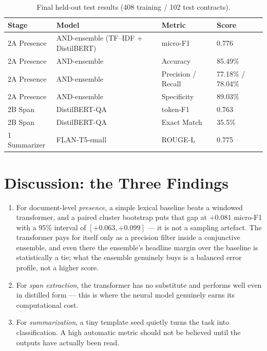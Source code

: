 \begin{table}[ht]
\centering
\caption{Final held-out test results (408 training / 102 test contracts).}
\label{tab:scorecard}
\small
\begin{tabular}{llll}
\toprule
\textbf{Stage} & \textbf{Model} & \textbf{Metric} & \textbf{Score}\\
\midrule
2A Presence & AND-ensemble (TF--IDF + DistilBERT) & micro-F1  & 0.776\\
2A Presence & AND-ensemble & Accuracy               & 85.49\%\\
2A Presence & AND-ensemble & Precision / Recall     & 77.18\% / 78.04\%\\
2A Presence & AND-ensemble & Specificity            & 89.03\%\\
2B Span     & DistilBERT-QA & token-F1              & 0.763\\
2B Span     & DistilBERT-QA & Exact Match           & 35.5\%\\
1 Summarizer & FLAN-T5-small & ROUGE-L              & 0.775\\
\bottomrule
\end{tabular}
\end{table}

\section{Discussion: the Three Findings}
\begin{enumerate}[itemsep=2pt]
  \item For document-level \emph{presence}, a simple lexical baseline beats a windowed transformer, and a paired cluster bootstrap puts that gap at $+0.081$ micro-F1 with a 95\% interval of $[+0.063, +0.099]$ --- it is not a sampling artefact. The transformer pays for itself only as a precision filter inside a conjunctive ensemble, and even there the ensemble's headline margin over the baseline is statistically a tie; what the ensemble genuinely buys is a balanced error profile, not a higher score.
  \item For \emph{span extraction}, the transformer has no substitute and performs well even in distilled form --- this is where the neural model genuinely earns its computational cost.
  \item For \emph{summarization}, a tiny template seed quietly turns the task into classification. A high automatic metric should not be believed until the outputs have actually been read.
\end{enumerate}
